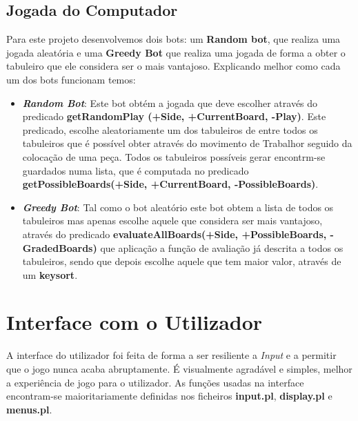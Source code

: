 \documentclass[a4paper]{article}
\begin{document}
\newpage

\subsection{Jogada do Computador}
Para este projeto desenvolvemos dois bots:  um \textbf {Random bot}, que realiza uma jogada aleatória e uma \textbf{Greedy Bot} que realiza uma jogada de forma a obter o tabuleiro que ele considera ser o mais vantajoso. Explicando melhor como cada um dos bots funcionam temos:
\begin{itemize}
 	\item \textbf{\textit{Random Bot}}: Este bot obtém a jogada que deve escolher através do predicado \textbf{getRandomPlay (+Side, +CurrentBoard, -Play)}. Este predicado, escolhe aleatoriamente um dos tabuleiros de entre todos os tabuleiros que é possível obter através do movimento de Trabalhor seguido da colocação de uma peça. Todos os tabuleiros possíveis gerar encontrm-se guardados numa lista, que é computada no predicado \textbf{getPossibleBoards(+Side, +CurrentBoard, -PossibleBoards)}.
	\item\textbf{\textit{Greedy Bot}}: Tal como o bot aleatório este bot obtem a lista de todos os tabuleiros mas apenas escolhe aquele que considera ser mais vantajoso, através do predicado \textbf{evaluateAllBoards(+Side, +PossibleBoards, -GradedBoards)} que aplicação a função de avaliação já descrita a todos os tabuleiros, sendo que depois escolhe aquele que tem maior valor, através de um \textbf{keysort}.
\end{itemize}

\newpage

\section{Interface com o Utilizador}

A interface do utilizador foi feita de forma a ser resiliente a \textit{Input} e a permitir que o jogo nunca acaba abruptamente. É visualmente agradável e simples, melhor a experiência de jogo para o utilizador. As funções usadas na interface encontram-se maioritariamente definidas nos ficheiros \textbf{input.pl}, \textbf{display.pl} e \textbf{menus.pl}.
\end{document}

